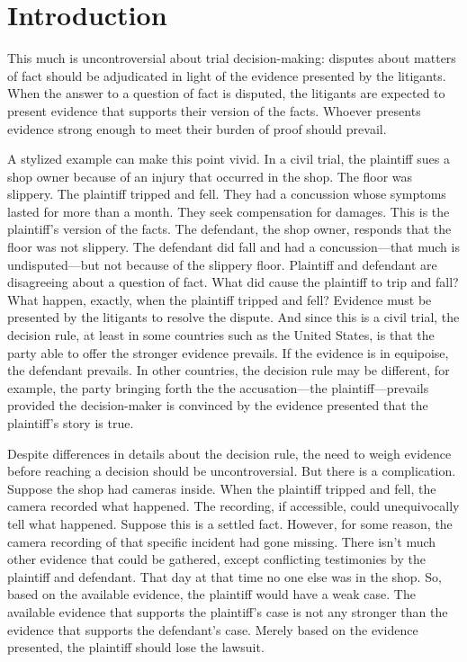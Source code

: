 \documentclass[
  10pt,
  dvipsnames,enabledeprecatedfontcommands]{scrartcl}
\begin{document}
\hypertarget{introduction}{%
\section{Introduction}\label{introduction}}

This much is uncontroversial about trial decision-making: disputes about
matters of fact should be adjudicated in light of the evidence presented
by the litigants. When the answer to a question of fact is disputed, the
litigants are expected to present evidence that supports their version
of the facts. Whoever presents evidence strong enough to meet their
burden of proof should prevail.

A stylized example can make this point vivid. In a civil trial, the
plaintiff sues a shop owner because of an injury that occurred in the
shop. The floor was slippery. The plaintiff tripped and fell. They had a
concussion whose symptoms lasted for more than a month. They seek
compensation for damages. This is the plaintiff's version of the facts.
The defendant, the shop owner, responds that the floor was not slippery.
The defendant did fall and had a concussion---that much is
undisputed---but not because of the slippery floor. Plaintiff and
defendant are disagreeing about a question of fact. What did cause the
plaintiff to trip and fall? What happen, exactly, when the plaintiff
tripped and fell? Evidence must be presented by the litigants to resolve
the dispute. And since this is a civil trial, the decision rule, at
least in some countries such as the United States, is that the party
able to offer the stronger evidence prevails. If the evidence is in
equipoise, the defendant prevails. In other countries, the decision rule
may be different, for example, the party bringing forth the the
accusation---the plaintiff---prevails provided the decision-maker is
convinced by the evidence presented that the plaintiff's story is true.

Despite differences in details about the decision rule, the need to
weigh evidence before reaching a decision should be uncontroversial. But
there is a complication. Suppose the shop had cameras inside. When the
plaintiff tripped and fell, the camera recorded what happened. The
recording, if accessible, could unequivocally tell what happened.
Suppose this is a settled fact. However, for some reason, the camera
recording of that specific incident had gone missing. There isn't much
other evidence that could be gathered, except conflicting testimonies by
the plaintiff and defendant. That day at that time no one else was in
the shop. So, based on the available evidence, the plaintiff would have
a weak case. The available evidence that supports the plaintiff's case
is not any stronger than the evidence that supports the defendant's
case. Merely based on the evidence presented, the plaintiff should lose
the lawsuit.
\end{document}
